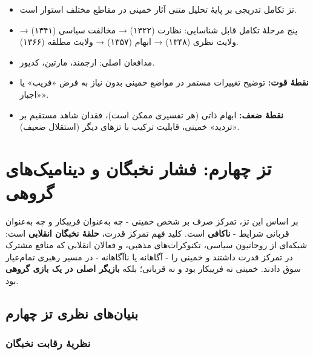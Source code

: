 \documentclass[12pt,a4paper]{book}
\newcommand{\keyword}[1]{\textbf{\textcolor{cPrimary}{#1}}}
\begin{document}
\begin{principleBox}
\begin{itemize}[label=\textcolor{cPrimary}{$\blacksquare$}, rightmargin=2em]
    \item تز تکامل تدریجی بر پایهٔ تحلیل متنی آثار خمینی در مقاطع مختلف استوار است.
    \item پنج مرحلهٔ تکامل قابل شناسایی: نظارت (۱۳۲۲) → مخالفت سیاسی (۱۳۴۱) → ولایت نظری (۱۳۴۸) → ابهام (۱۳۵۷) → ولایت مطلقه (۱۳۶۶).
    \item مدافعان اصلی: ارجمند، مارتین، کدیور.
    \item \keyword{نقطهٔ قوت:} توضیح تغییرات مستمر در مواضع خمینی بدون نیاز به فرض «فریب» یا «اجبار».
    \item \keyword{نقطهٔ ضعف:} ابهام ذاتی (هر تفسیری ممکن است)، فقدان شاهد مستقیم بر «تردید» خمینی، قابلیت ترکیب با تزهای دیگر (استقلال ضعیف).
\end{itemize}
\end{principleBox}


\chapter{تز چهارم: فشار نخبگان و دینامیک‌های گروهی}
\label{chap:be2f64}


\begin{infoBox}
بر اساس این تز، تمرکز صرف بر شخص خمینی - چه به‌عنوان فریبکار و چه به‌عنوان قربانی شرایط - \keyword{ناکافی} است. کلید فهم تمرکز قدرت، \keyword{حلقهٔ نخبگان انقلابی} است: شبکه‌ای از روحانیون سیاسی، تکنوکرات‌های مذهبی، و فعالان انقلابی که منافع مشترک در تمرکز قدرت داشتند و خمینی را - آگاهانه یا ناآگاهانه - در مسیر رهبری تمام‌عیار سوق دادند. خمینی نه فریبکار بود و نه قربانی؛ بلکه \keyword{بازیگر اصلی در یک بازی گروهی} بود.
\end{infoBox}

\section{بنیان‌های نظری تز چهارم}

\subsection{نظریهٔ رقابت نخبگان}
\end{document}
